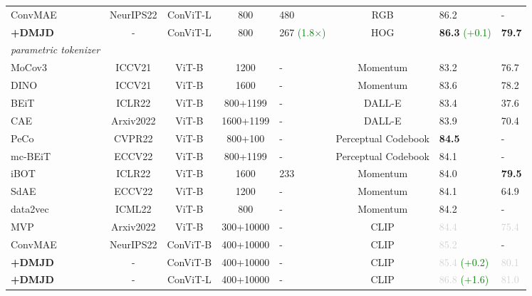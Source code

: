 \documentclass[lettersize,journal]{IEEEtran}
\begin{document}
\begin{table*}
\begin{center}
\begin{tabular}{lccclcll}
        ConvMAE~\cite{2022arXiv220503892G} & NeurIPS22 & ConViT-L & 800 & 480 & RGB & 86.2 & - \\
        \rowcolor{mygray} \quad \textbf{+DMJD} &- & ConViT-L & 800 & 267 \textcolor{Green}{(1.8$\times$)} & HOG & \textbf{86.3} \textcolor{Green}{(+0.1)} & \textbf{79.7} \\
        \hline
        \emph{parametric tokenizer}      \\
        MoCov3~\cite{chen2021empirical} & ICCV21 & ViT-B & 1200 & - & Momentum & 83.2 & 76.7 \\
        DINO~\cite{caron2021emerging} & ICCV21 & ViT-B & 1600 & - & Momentum & 83.6 & 78.2 \\
        BEiT~\cite{2021arXiv210608254B} & ICLR22 & ViT-B & 800+1199 & - & DALL-E & 83.4 & 37.6 \\
        CAE~\cite{2022arXiv220203026C} & Arxiv2022 & ViT-B & 1600+1199 & - & DALL-E & 83.9 & 70.4 \\
        PeCo~\cite{2021arXiv211112710D} & CVPR22 & ViT-B & 800+100 & - & Perceptual Codebook & \textbf{84.5} & - \\
        mc-BEiT~\cite{Li2022mcBEiTMD} & ECCV22 & ViT-B & 800+1199 & - & Perceptual Codebook & 84.1 & - \\
        iBOT~\cite{2021arXiv211107832Z} & ICLR22 & ViT-B & 1600 & 233 & Momentum & 84.0 & \textbf{79.5} \\
        SdAE~\cite{2022arXiv220800449C} & ECCV22 & ViT-B & 1200 & - & Momentum & 84.1 & 64.9 \\
        data2vec~\cite{Baevski2022data2vecAG} & ICML22 & ViT-B & 800 & - & Momentum & 84.2 & - \\
        MVP~\cite{2022arXiv220305175W} & Arxiv2022 & ViT-B & 300+10000 & - & CLIP & \textcolor{lightgray}{84.4} & \textcolor{lightgray}{75.4} \\
        ConvMAE~\cite{2022arXiv220503892G} & NeurIPS22 & ConViT-B & 400+10000 & - & CLIP & \textcolor{lightgray}{85.2} & - \\
        \rowcolor{mygray} \quad \textbf{+DMJD} & -& ConViT-B & 400+10000 & - & CLIP & \textcolor{lightgray}{85.4} \textcolor{Green}{(+0.2)} & \textcolor{lightgray}{80.1} \\
        \rowcolor{mygray} \quad \textbf{+DMJD} & -& ConViT-L & 400+10000 & - & CLIP & \textcolor{lightgray}{86.8} \textcolor{Green}{(+1.6)} & \textcolor{lightgray}{81.0} \\
        \bottomrule
      \end{tabular}
\end{center}
\end{table*}
\end{document}
